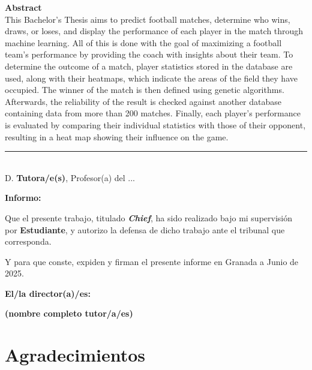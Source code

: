 \noindent\textbf{Abstract}\\
This Bachelor’s Thesis aims to predict football matches, determine who wins, draws, or loses, and display the performance of each player in the match through machine learning. All of this is done with the goal of maximizing a football team's performance by providing the coach with insights about their team. To determine the outcome of a match, player statistics stored in the database are used, along with their heatmaps, which indicate the areas of the field they have occupied. The winner of the match is then defined using genetic algorithms. Afterwards, the reliability of the result is checked against another database containing data from more than 200 matches. Finally, each player's performance is evaluated by comparing their individual statistics with those of their opponent, resulting in a heat map showing their influence on the game.

\cleardoublepage

\thispagestyle{empty}

\noindent\rule[-1ex]{\textwidth}{2pt}\\[4.5ex]

D. \textbf{Tutora/e(s)}, Profesor(a) del ...

\vspace{0.5cm}

\textbf{Informo:}

\vspace{0.5cm}

Que el presente trabajo, titulado \textit{\textbf{Chief}},
ha sido realizado bajo mi supervisión por \textbf{Estudiante}, y autorizo la defensa de dicho trabajo ante el tribunal
que corresponda.

\vspace{0.5cm}

Y para que conste, expiden y firman el presente informe en Granada a Junio de 2025.

\vspace{1cm}

\textbf{El/la director(a)/es: }

\vspace{5cm}

\noindent \textbf{(nombre completo tutor/a/es)}

\chapter*{Agradecimientos}




